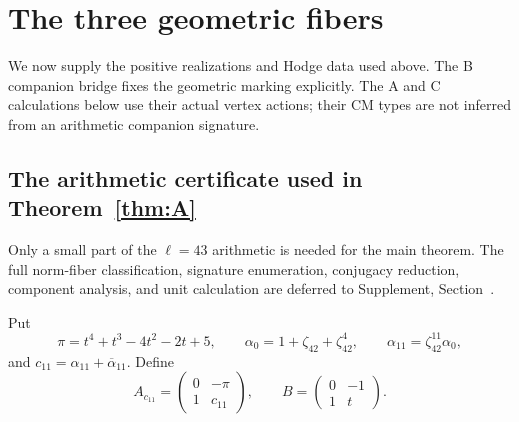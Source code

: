 \section{The three geometric fibers}
We now supply the positive realizations and Hodge data used above. The B
companion bridge fixes the geometric marking explicitly. The A and C
calculations below use their actual vertex actions; their CM types are not
inferred from an arithmetic companion signature.

\subsection{The arithmetic certificate used in Theorem~\ref{thm:A}}\label{sec:maincertificate}
Only a small part of the $\ell=43$ arithmetic is needed for the main theorem.  The full norm-fiber classification, signature enumeration, conjugacy reduction, component analysis, and unit calculation are deferred to Supplement, Section~.

Put
\[
 \pi=t^4+t^3-4t^2-2t+5,
 \qquad
 \alpha_0=1+\zeta_{42}+\zeta_{42}^4,
 \qquad
 \alpha_{11}=\zeta_{42}^{11}\alpha_0,
\]
and $c_{11}=\alpha_{11}+\overline{\alpha}_{11}$.  Define
\[
 A_{c_{11}}=\begin{pmatrix}0&-\pi\\1&c_{11}\end{pmatrix},
 \qquad
 B=\begin{pmatrix}0&-1\\1&t\end{pmatrix}.
\]

